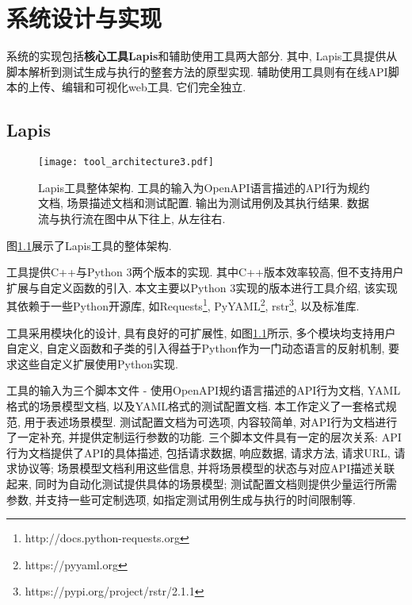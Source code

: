 \chapter{系统设计与实现}

    系统的实现包括\textbf{核心工具Lapis}和辅助使用工具两大部分. 其中, Lapis工具提供从脚本解析到测试生成与执行的整套方法的原型实现. 辅助使用工具则有在线API脚本的上传、编辑和可视化web工具. 它们完全独立.


	\section{Lapis}
	
	    \begin{figure}[!htb]
	        \centering
	        \texttt{[image: tool\_architecture3.pdf]}
	        \caption{Lapis工具整体架构. 工具的输入为OpenAPI语言描述的API行为规约文档, 场景描述文档和测试配置. 输出为测试用例及其执行结果. 数据流与执行流在图中从下往上, 从左往右.}
	        \label{fig:lapis_arch}
	    \end{figure}
	    
	    \label{sec:lapis_impl}
	    
	    图\ref{fig:lapis_arch}展示了Lapis工具的整体架构.
	    
	    工具提供C++与Python 3两个版本的实现. 其中C++版本效率较高, 但不支持用户扩展与自定义函数的引入. 本文主要以Python 3实现的版本进行工具介绍, 该实现其依赖于一些Python开源库, 如Requests\footnote{http://docs.python-requests.org}, PyYAML\footnote{https://pyyaml.org}, rstr\footnote{https://pypi.org/project/rstr/2.1.1}, 以及标准库.
	    
	    工具采用模块化的设计, 具有良好的可扩展性, 如图\ref{fig:lapis_arch}所示, 多个模块均支持用户自定义, 自定义函数和子类的引入得益于Python作为一门动态语言的反射机制, 要求这些自定义扩展使用Python实现.
	    
	    工具的输入为三个脚本文件 - 使用OpenAPI规约语言描述的API行为文档, YAML格式的场景模型文档, 以及YAML格式的测试配置文档. 本工作定义了一套格式规范, 用于表述场景模型. 测试配置文档为可选项, 内容较简单, 对API行为文档进行了一定补充, 并提供定制运行参数的功能. 三个脚本文件具有一定的层次关系: API行为文档提供了API的具体描述, 包括请求数据, 响应数据, 请求方法, 请求URL, 请求协议等; 场景模型文档利用这些信息, 并将场景模型的状态与对应API描述关联起来, 同时为自动化测试提供具体的场景模型; 测试配置文档则提供少量运行所需参数, 并支持一些可定制选项, 如指定测试用例生成与执行的时间限制等.
	    
